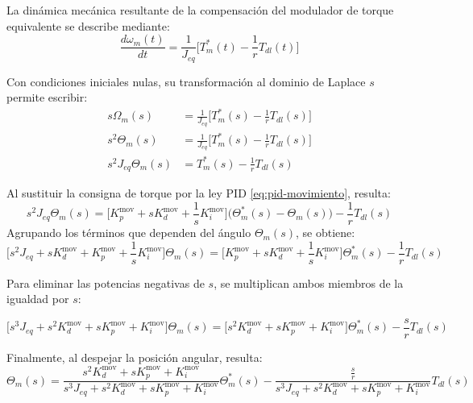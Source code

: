 \documentclass[blue,fullpaper]{ludusofficial}  %
\begin{document}
La dinámica mecánica resultante de la compensación del modulador de torque equivalente se describe mediante:
\begin{equation}
\label{eq:mecanica-compensada}
\frac{d\omega_{m}(t)}{dt} = \frac{1}{J_{eq}} \Big[ T_{m}^{*}(t)- \frac{1}{r} T_{dl}(t) \Big]
\end{equation}

Con condiciones iniciales nulas, su transformación al dominio de Laplace $s$ permite escribir:
\begin{align*}
s\Omega_{m}(s)  & = \frac{1}{J_{eq}} \Big[ T_{m}^{*}(s)- \frac{1}{r} T_{dl}(s) \Big] \\ 
s^{2}\Theta_{m}(s)  & = \frac{1}{J_{eq}} \Big[ T_{m}^{*}(s)- \frac{1}{r} T_{dl}(s) \Big] \\
s^{2}J_{eq} \Theta_{m}(s)  & = T_{m}^{*}(s)- \frac{1}{r} T_{dl}(s) 
\end{align*}

Al sustituir la consigna de torque por la ley PID \eqref{eq:pid-movimiento}, %
resulta:
\[
s^{2}J_{eq} \Theta_{m}(s) = \Big[  K_{p}^{\text{mov}} + sK_{d}^{\text{mov}} + \frac{1}{s}K_{i}^{\text{mov}} \Big] \Big( \Theta^{*}_{m}(s) - \Theta_{m}(s) \Big) - \frac{1}{r} T_{dl}(s) 
\]
Agrupando los términos que dependen del ángulo $\Theta_m(s)$, se obtiene:
\[
\Big[ s^{2}J_{eq} + sK_{d}^{\text{mov}} + K_{p}^{\text{mov}}  + \frac{1}{s}K_{i}^{\text{mov}} \Big] \Theta_{m}(s) = \Big[  K_{p}^{\text{mov}} + sK_{d}^{\text{mov}} + \frac{1}{s}K_{i}^{\text{mov}} \Big] \Theta^{*}_{m}(s) - \frac{1}{r} T_{dl}(s) 
\]

Para eliminar las potencias negativas de $s$, se multiplican ambos miembros de la igualdad por $s$:

\[
\Big[ s^{3}J_{eq} + s^{2}K_{d}^{\text{mov}} + sK_{p}^{\text{mov}}  + K_{i}^{\text{mov}} \Big] \Theta_{m}(s) = \Big[  s^{2}K_{d}^{\text{mov}} + sK_{p}^{\text{mov}} + K_{i}^{\text{mov}} \Big] \Theta^{*}_{m}(s) - \frac{s}{r} T_{dl}(s) 
\]

Finalmente, al despejar la posición angular, resulta:
\begin{equation}
\label{eq:respuesta-posicion-lc}
\Theta_{m}(s) = \frac{  s^{2}K_{d}^{\text{mov}} + sK_{p}^{\text{mov}} + K_{i}^{\text{mov}} }{ s^{3}J_{eq} + s^{2}K_{d}^{\text{mov}} + sK_{p}^{\text{mov}}  + K_{i}^{\text{mov}} } \Theta^{*}_{m}(s) - \frac{\frac{s}{r}}{ s^{3}J_{eq} + s^{2}K_{d}^{\text{mov}} + sK_{p}^{\text{mov}}  + K_{i}^{\text{mov}} } T_{dl}(s) 
\end{equation}
\end{document}
